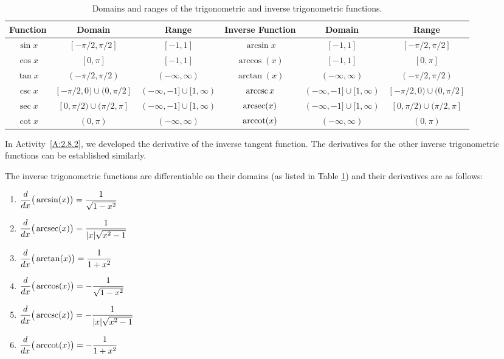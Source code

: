 \begin{table} \label{fig:domain_trig}
\begin{tabular}{cccccc}
Function & Domain & Range &\parbox[b]{40pt}{\centering Inverse Function} & Domain & Range\\ \hline
\rule{0pt}{12pt} $\sin x$ & $[-\pi/2, \pi/2]$ & $[-1,1]$&$\arcsin x$ & $[-1,1]$ & $[-\pi/2, \pi/2]$ \\
\rule{0pt}{12pt}$\cos x$ & $[0,\pi]$ & $[-1,1]$&$\arccos(x)$ & $[-1,1]$ & $[0,\pi]$ \\
\rule{0pt}{12pt}$\tan x$ & $(-\pi/2,\pi/2)$ & $(-\infty,\infty)$&$\arctan(x)$ & $(-\infty,\infty)$ & $(-\pi/2,\pi/2)$	\\
\rule{0pt}{12pt} $\csc x$ & $[-\pi/2,0)\cup (0, \pi/2]$ & $(-\infty,-1]\cup [1,\infty)$&$\operatorname{arccsc} x$ & $(-\infty,-1]\cup [1,\infty)$ & $[-\pi/2,0)\cup (0, \pi/2]$  \\
\rule{0pt}{12pt}$\sec x$ & $[0,\pi/2)\cup (\pi/2,\pi]$ & $(-\infty,-1]\cup [1,\infty)$&$\operatorname{arcsec}(x)$ & $(-\infty,-1]\cup [1,\infty)$ & $[0,\pi/2)\cup (\pi/2,\pi]$ \\
\rule{0pt}{12pt}$\cot x$ & $(0,\pi)$ & $(-\infty,\infty)$&$\operatorname{arccot}(x)$ &  $ (-\infty,\infty)$ & $(0,\pi)$	
\end{tabular}
\caption{Domains and ranges of the trigonometric and inverse trigonometric functions.}
\end{table}


In Activity~\ref{A:2.8.2}, we developed the derivative of the inverse tangent function. The derivatives for the other inverse trigonometric functions can be established similarly. 

{The inverse trigonometric functions are differentiable on their domains (as listed in Table \ref{fig:domain_trig}) and their derivatives are as follows:\\ \small

\bmtwo
\begin{enumerate}[1)]
\item $\displaystyle \frac{d}{dx}\big(\arcsin(x)\big) = \frac{1}{\sqrt{1-x^2}}$ 
\item $\displaystyle \frac{d}{dx}\big(\operatorname{arcsec}(x)\big) = \frac{1}{|x|\sqrt{x^2-1}}$
\item $\displaystyle \frac{d}{dx}\big(\arctan(x)\big) = \frac{1}{1+x^2}$
\item $\displaystyle \frac{d}{dx}\big(\arccos(x)\big) = -\frac{1}{\sqrt{1-x^2}}$ 
\item $\displaystyle \frac{d}{dx}\big(\operatorname{arccsc}(x)\big) = -\frac{1}{|x|\sqrt{x^2-1}}$
\item $\displaystyle \frac{d}{dx}\big(\operatorname{arccot}(x)\big) = -\frac{1}{1+x^2}$
\end{enumerate} \normalsize
\emtwo
} %

